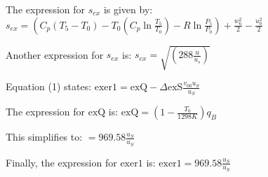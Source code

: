 The expression for \( s_{ex} \) is given by:
\( s_{ex} = (C_p (T_5 - T_0) - T_0 (C_p \ln \frac{T_5}{T_0}) - R \ln \frac{P_5}{P_0}) + \frac{w_6^2}{2} - \frac{u_0^2}{2} \)

Another expression for \( s_{ex} \) is:
\( s_{ex} = \sqrt{(288 \frac{u}{u_s})} \)

Equation (1) states:
\( \text{exer1} = \text{exQ} - \Delta \text{exS} \frac{v_{00} u_{S}}{u_{S}} \)

The expression for \( \text{exQ} \) is:
\( \text{exQ} = \left(1 - \frac{T_0}{1298K}\right) q_B \)

This simplifies to:
\( = 969.58 \frac{u_{S}}{u_{S}} \)

Finally, the expression for \( \text{exer1} \) is:
\( \text{exer1} = 969.58 \frac{u_{S}}{u_{S}} \)